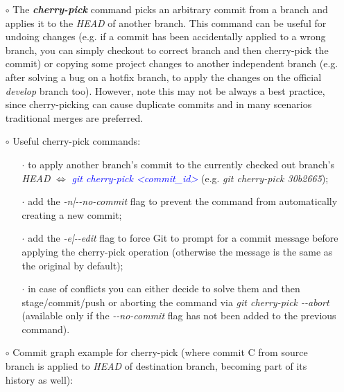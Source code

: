\documentclass[a4paper,portrait,10pt]{article}   %
\newcommand{\mybulletlvA}{$\circ$}   %
\newcommand{\mybulletlvB}{$\cdot$}   %
\newcommand{\mydiv}{$\Leftrightarrow$ }   %
\newcommand{\mysapo}[1]{\textquotesingle #1\textquotesingle }   %
\newcommand{\mycmd}[1]{\textcolor{blue}{\textit{#1}}}   %
\newcommand{\myvspace}{\vspace{4mm}}   %
\newcommand{\mytzbrdist}{1.75cm}   %
\begin{document}
\begin{itemize}
\item[\mybulletlvA] The \textbf{\textit{cherry-pick}} command picks an arbitrary commit from a branch and applies it to the \textit{HEAD} of another branch. This command can be useful for undoing changes (e.g. if a commit has been accidentally applied to a wrong branch, you can simply checkout to correct branch and then cherry-pick the commit) or copying some project changes to another independent branch (e.g. after solving a bug on a hotfix branch, to apply the changes on the official \textit{develop} branch too). However, note this may not be always a best practice, since cherry-picking can cause duplicate commits and in many scenarios traditional merges are preferred.
\myvspace

\item[\mybulletlvA] Useful cherry-pick commands:
\begin{itemize}
  \item[\mybulletlvB] to apply another branch's commit to the currently checked out branch's \textit{HEAD} \mydiv \mycmd{git cherry-pick <commit\_id>} (e.g. \textit{git cherry-pick 30b2665});
  \item[\mybulletlvB] add the \textit{-n|-{}-no-commit} flag to prevent the command from automatically creating a new commit;
  \item[\mybulletlvB] add the \textit{-e|-{}-edit} flag to force Git to prompt for a commit message before applying the cherry-pick operation (otherwise the message is the same as the original by default);
  \item[\mybulletlvB] in case of conflicts you can either decide to solve them and then stage/commit/push or aborting the command via \textit{git cherry-pick -{}-abort} (available only if the \textit{-{}-no-commit} flag has not been added to the previous command).
\end{itemize}
\myvspace

\item[\mybulletlvA] Commit graph example for cherry-pick (where commit \mysapo{C} from source branch is applied to \textit{HEAD} of destination branch, becoming part of its history as well):
\begin{figure}[h!]
\centering
{}
\end{figure}
\end{itemize}
\end{document}
